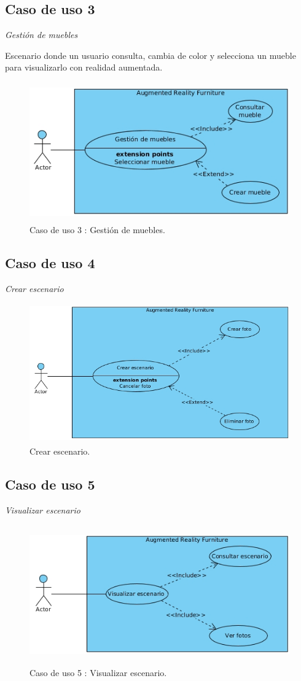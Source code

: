 \subsection{Caso de uso 3} \textit{Gestión de muebles} \par
Escenario donde un usuario consulta, cambia de color y selecciona un mueble para visualizarlo con realidad aumentada.
\begin{figure}[h!]
	\centering
	\includegraphics[width=12cm,height=6cm]{imagenes/analisis/seleccionarMueble.jpg}
	\caption{Caso de uso 3 : Gestión de muebles.}
	\label{fig:analogo}
\end{figure}

\subsection{Caso de uso 4}\textit{Crear escenario} 
\vspace{5mm}
\begin{figure}[h!]
	\centering
	\includegraphics[width=12cm,height=6cm]{imagenes/analisis/crearEscenario.jpg}
	\caption{Crear escenario.}
	\label{fig:analogo}
\end{figure}

\subsection{Caso de uso 5}\textit{Visualizar escenario} 
\vspace{5mm}
\begin{figure}[h!]
	\centering
	\includegraphics[width=12cm,height=6cm]{imagenes/analisis/visualizarEscenario.jpg}
	\caption{Caso de uso 5 : Visualizar escenario.}
	\label{fig:analogo}
\end{figure}